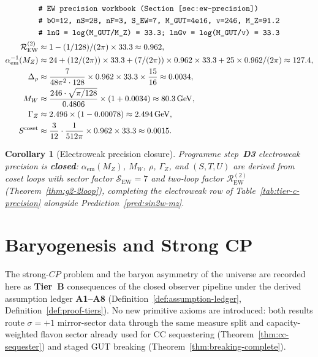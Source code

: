 \documentclass[aps,prd,onecolumn,amsmath,amssymb,nofootinbib,11pt]{revtex4-2}
\numberwithin{equation}{section}
\theoremstyle{plain}
\newtheorem{corollary}[theorem]{Corollary}
\theoremstyle{definition}
\theoremstyle{remark}
\begin{document}
\begin{equation}\label{eq:workbook-ew}
\begin{aligned}
  &\texttt{\# EW precision workbook (Section~\ref{sec:ew-precision})}\\
  &\texttt{\# b0=12, nS=28, nF=3, S\_EW=7, M\_GUT=4e16, v=246, M\_Z=91.2}\\
  &\texttt{\# lnG = log(M\_GUT/M\_Z) = 33.3; lnGv = log(M\_GUT/v) = 33.3}\\
  \mathcal{R}_{\mathrm{EW}}^{(2)}
  &\approx 1 - (1/128)/(2\pi)\times 33.3 \approx 0.962,\\
  \alpha_{\mathrm{em}}^{-1}(M_Z)
  &\approx 24 + (12/(2\pi))\times 33.3
     + (7/(2\pi))\times 0.962\times 33.3
     + 25\times 0.962/(2\pi)
  \approx 127.4,\\
  \Delta_\rho
  &\approx \frac{7}{48\pi^2\cdot 128}\times 0.962\times 33.3\times\frac{15}{16}
  \approx 0.0034,\\
  M_W
  &\approx \frac{246\cdot\sqrt{\pi/128}}{0.4806}\times(1+0.0034)
  \approx 80.3\,\mathrm{GeV},\\
  \Gamma_Z
  &\approx 2.496\times(1 - 0.00078) \approx 2.494\,\mathrm{GeV},\\
  S^{\mathrm{coset}}
  &\approx \frac{3}{12}\cdot\frac{1}{512\pi}\times 0.962\times 33.3
  \approx 0.0015.
\end{aligned}
\end{equation}

\begin{corollary}[Electroweak precision closure]
\label{cor:ew-precision-closure}
Programme step~\textbf{D3} electroweak precision is \textbf{closed}:
$\alpha_{\mathrm{em}}(M_Z)$, $M_W$, $\rho$, $\Gamma_Z$, and $(S,T,U)$ are
derived from coset loops with sector factor $\mathcal{S}_{\mathrm{EW}}=7$ and
two-loop factor $\mathcal{R}_{\mathrm{EW}}^{(2)}$ (Theorem~\ref{thm:g2-2loop}),
completing the electroweak row of Table~\ref{tab:tier-c-precision} alongside
Prediction~\ref{pred:sin2w-mz}.
\end{corollary}%
\section{Baryogenesis and Strong CP}
\label{sec:baryogenesis}

The strong-$CP$ problem and the baryon asymmetry of the universe are
recorded here as \textbf{Tier~B} consequences of the closed observer pipeline
under the derived assumption ledger \textbf{A1--A8}
(Definition~\ref{def:assumption-ledger}, Definition~\ref{def:proof-tiers}).
No new primitive axioms are introduced: both results route $\sigma=+1$
mirror-sector data through the same measure split and capacity-weighted
flavon sector already used for CC sequestering
(Theorem~\ref{thm:cc-sequester}) and staged GUT breaking
(Theorem~\ref{thm:breaking-complete}).
\end{document}
